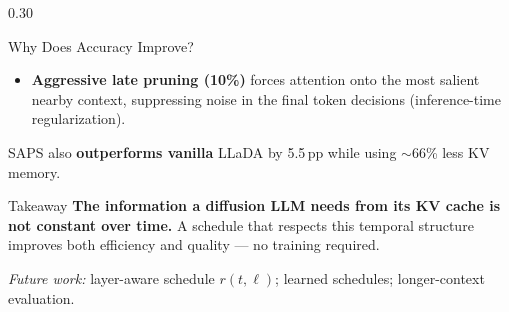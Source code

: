\documentclass[final]{beamer}
\begin{document}
\begin{frame}[t]{}
\begin{columns}[t,totalwidth=\linewidth]
\begin{column}{0.30\linewidth}
\begin{block}{Why Does Accuracy Improve?}
\begin{itemize}
      \item \textbf{Aggressive late pruning (10\%)} forces attention
            onto the most salient nearby context, suppressing noise
            in the final token decisions (inference-time regularization).
    \end{itemize}

    \vspace{0.3em}
    SAPS also \textbf{outperforms vanilla} LLaDA by 5.5\,pp
    while using $\sim$66\% less KV memory.
  \end{block}

  \vspace{0.8em}

  \begin{block}{Takeaway}
    \textbf{The information a diffusion LLM needs from its KV cache is
    not constant over time.} A schedule that respects this temporal
    structure improves both efficiency and quality — no training required.

    \vspace{0.4em}
    \textit{Future work:} layer-aware schedule $r(t, \ell)$;
    learned schedules; longer-context evaluation.
  \end{block}

\end{column}

\end{columns}

\end{frame}
\end{document}
